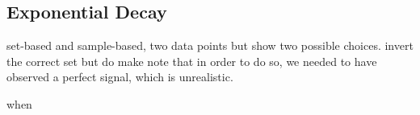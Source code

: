 \subsection{Exponential Decay}\label{sec:ch02-decay}

set-based and sample-based, two data points but show two possible choices.
invert the correct set but do make note that in order to do so, we needed to have observed a perfect signal, which is unrealistic.

when 
